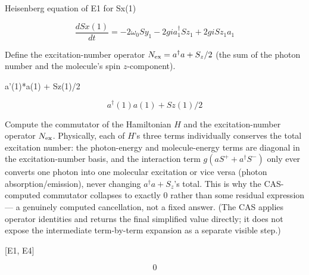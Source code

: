 \documentclass[dvipdfmx]{article}
\begin{document}
Heisenberg equation of E1 for Sx(1)

\begin{equation}
  \frac{d Sx(1)}{d t} = - 2 \omega_{0} Sy_1 - 2 g \mathit{i} {a}_{1}^{\dagger} Sz_1 + 2 g \mathit{i} Sz_1 {a}_{1}
  \label{eq:E3}
\end{equation}

Define the excitation-number operator $N_{\rm ex}=a^\dagger a+S_z/2$ (the sum of the photon number and the molecule's spin $z$-component).

a'(1)*a(1) + Sz(1)/2

\begin{equation}
  a^{\dagger}(1) a(1) + Sz(1)/2
  \label{eq:E4}
\end{equation}

Compute the commutator of the Hamiltonian $H$ and the excitation-number operator $N_{\rm ex}$. Physically, each of $H$'s three terms individually conserves the total excitation number: the photon-energy and molecule-energy terms are diagonal in the excitation-number basis, and the interaction term $g(aS^++a^\dagger S^-)$ only ever converts one photon into one molecular excitation or vice versa (photon absorption/emission), never changing $a^\dagger a+S_z$'s total. This is why the CAS-computed commutator collapses to exactly 0 rather than some residual expression — a genuinely computed cancellation, not a fixed answer. (The CAS applies operator identities and returns the final simplified value directly; it does not expose the intermediate term-by-term expansion as a separate visible step.)

[E1, E4]

\begin{equation}
  0
  \label{eq:E5}
\end{equation}
\end{document}
